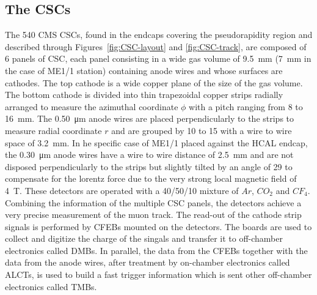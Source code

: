 	\subsection{The \acl{CSC}s}
	\label{chapt3:ssec:CSCs}
	
	The 540 CMS CSCs, found in the endcaps covering the pseudorapidity region  and described through Figures~\ref{fig:CSC-layout} and \ref{fig:CSC-track}, are composed of 6 panels of CSC, each panel consisting in a wide gas volume of \SI{9.5}{mm} (\SI{7}{mm} in the case of ME1/1 station) containing anode wires and whose surfaces are cathodes. The top cathode is a wide copper plane of the size of the gas volume. The bottom cathode is divided into thin trapezoidal copper strips radially arranged to measure the azimuthal coordinate $\phi$ with a pitch ranging from 8 to \SI{16}{mm}. The \SI{0.50}{\micro m} anode wires are placed perpendicularly to the strips to measure radial coordinate $r$ and are grouped by 10 to 15 with a wire to wire space of \SI{3.2}{mm}. In he specific case of ME1/1 placed against the HCAL endcap, the \SI{0.30}{\micro m} anode wires have a wire to wire distance of \SI{2.5}{mm} and are not disposed perpendicularly to the strips but slightly tilted by an angle of \SI{29}{\deg} to compensate for the lorentz force due to the very strong local magnetic field of \SI{4}{T}. These detectors are operated with a 40/50/10 mixture of $Ar$, $CO_2$ and $CF_4$. Combining the information of the multiple CSC panels, the detectors achieve a very precise measurement of the muon track. The read-out of the cathode strip signals is performed by \acf{CFEBs} mounted on the detectors. The boards are used to collect and digitize the charge of the singals and transfer it to off-chamber electronics called \acf{DMBs}. In parallel, the data from the CFEBs together with the data from the anode wires, after treatment by on-chamber electronics called \acf{ALCTs}, is used to build a fast trigger information which is sent other off-chamber electronics called \acf{TMBs}.
	

